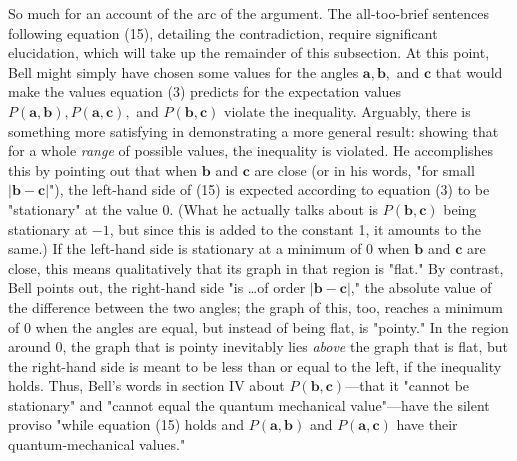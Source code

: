 So much for an account of the arc of the argument. The all-too-brief sentences following equation (15), detailing the contradiction, require 
significant elucidation, which will take up the remainder of this subsection. At this point, Bell might simply have chosen some values for the angles $\pmb{a}, \pmb{b},$  and $\pmb{c}$ that would make the values
equation (3) predicts for the expectation values $P(\pmb{a}, \pmb{b}), P(\pmb{a}, \pmb{c}),$ and
$P(\pmb{b}, \pmb{c})$ violate the inequality. Arguably, there is something more
satisfying in demonstrating a more general result: showing that for a whole \emph{range} of possible 
values, the inequality is violated. 
He accomplishes this by pointing out that when
$\pmb{b}$ and $\pmb{c}$ are close (or in his words, "for small $|\pmb{b} - \pmb{c}|$"),
the left-hand side of (15) is expected according to equation (3) to be "stationary" at the value 0.
(What he actually talks about is $P(\pmb{b}, \pmb{c})$ being stationary at $-1$, but since this
is added to the constant 1, it amounts to the same.) If the left-hand side is stationary at a minimum
of 0 when $\pmb{b}$ and $\pmb{c}$ are close, this means qualitatively that its graph in that region is "flat."
By contrast, Bell points out, the right-hand side "is \ldots of order $|\pmb{b} - \pmb{c}|$," the
absolute value of the difference between the two angles; the graph of this, too, reaches a minimum
of 0 when the angles are equal, but instead of being flat, is "pointy." In the region around 0, the graph that is 
pointy inevitably lies \emph{above} the graph that is flat, but the right-hand side is meant to be less
than or equal to the left, if the inequality holds. Thus, Bell's words in section IV about $P(\pmb{b}, \pmb{c})$---that it "cannot be stationary" and "cannot equal the quantum mechanical value"---have the silent proviso 
"while equation (15) holds and $P(\pmb{a},\pmb{b})$ and $P(\pmb{a},\pmb{c})$ have their 
quantum-mechanical values."

